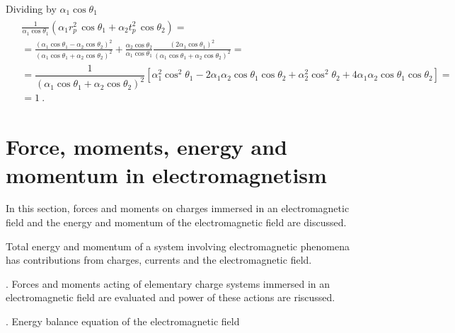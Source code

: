 \documentclass[letterpaper,10pt,english]{jupyterBook}
\begin{document}
\sphinxAtStartPar
Dividing by \(\alpha_1 \cos  \theta_1\)
\begin{equation*}
\begin{split}\begin{aligned}
 & \frac{1}{\alpha_1 \cos \theta_1} \left( \alpha_1 r_p^2 \, \cos \theta_1 + \alpha_2 t_p^2 \, \cos \theta_2 \right) = \\
 & = \frac{\left(\alpha_1 \cos \theta_1 - \alpha_2 \cos \theta_2\right)^2}{\left(\alpha_1 \cos \theta_1 + \alpha_2 \cos \theta_2\right)^2} + \frac{\alpha_2 \cos \theta_2}{\alpha_1 \cos \theta_1} \frac{\left( 2 \alpha_1 \cos \theta_1 \right)^2}{\left( \alpha_1 \cos \theta_1 + \alpha_2 \cos \theta_2 \right)^2} = \\
  & = \dfrac{1}{\left( \alpha_1 \cos \theta_1 + \alpha_2 \cos \theta_2 \right)^2} \left[ \alpha_1^2 \cos^2 \theta_1 - 2 \alpha_1 \alpha_2 \cos \theta_1 \cos \theta_2 + \alpha_2^2 \cos^2 \theta_2 + 4 \alpha_1 \alpha_2 \cos \theta_1 \cos \theta_2 \right] = \\
  & = 1 \ .
\end{aligned}\end{split}
\end{equation*}
\sphinxstepscope


\chapter{Force, moments, energy and momentum in electromagnetism}
\label{\detokenize{ch/energy:force-moments-energy-and-momentum-in-electromagnetism}}\label{\detokenize{ch/energy:classical-electromagnetism-energy}}\label{\detokenize{ch/energy::doc}}
\sphinxAtStartPar
In this section, forces and moments on charges immersed in an electromagnetic field and the energy and momentum of the electromagnetic field are discussed.

\sphinxAtStartPar
Total energy and momentum of a system involving electromagnetic phenomena has contributions from charges, currents and the electromagnetic field.

\sphinxAtStartPar
{\hyperref[\detokenize{ch/forces-moments-on-charges:classical-electromagnetism-forces-moments}]{}}. Forces and moments acting of elementary charge systems immersed in an electromagnetic field are evaluated and power of these actions are riscussed.

\sphinxAtStartPar
{\hyperref[\detokenize{ch/energy-momentum-balance:classical-electromagnetism-energy-momentum}]{}}. Energy balance equation of the electromagnetic field
\end{document}
